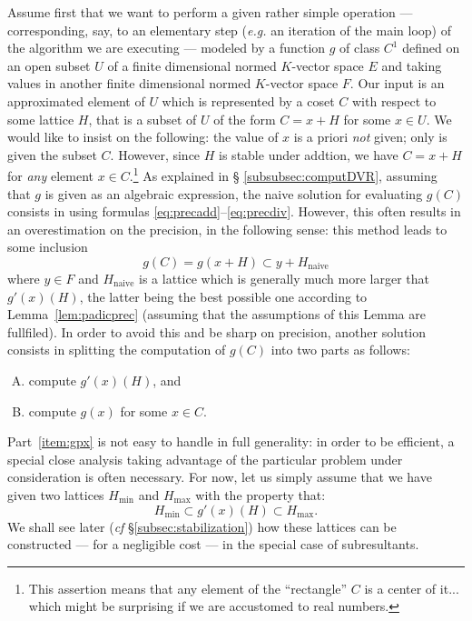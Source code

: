 \documentclass{article}
\begin{document}
Assume first that we want to perform a given rather simple operation --- 
corresponding, say, to an elementary step (\emph{e.g.} an iteration of 
the main loop) of the algorithm we are executing --- modeled by a 
function $g$ of class $C^1$ defined on an open subset $U$ of a finite 
dimensional normed $K$-vector space $E$ and taking values in another 
finite dimensional normed $K$-vector space $F$.
Our input is an approximated element of $U$ which is represented 
by a coset $C$ with respect to some lattice $H$, that is a subset of $U$ 
of the form $C = x+H$ for some $x \in U$. We would like to insist on the 
following: the value of $x$ is a priori \emph{not} given; only is given 
the subset $C$. However, since $H$ is stable under addtion, we have $C = 
x+H$ for \emph{any} element $x \in C$.\footnote{This assertion means that 
any element of the ``rectangle'' $C$ is a center of it... which might be 
surprising if we are accustomed to real numbers.} As explained in \S 
\ref{subsubsec:computDVR}, assuming that $g$ is given as an algebraic 
expression, the naive solution for evaluating $g(C)$ consists in using 
formulas \eqref{eq:precadd}--\eqref{eq:precdiv}. However, this often 
results in an overestimation on the precision, in the following sense: 
this method leads to some inclusion
$$g(C) = g(x+H) \subset y + H_{\text{naive}}$$
where $y \in F$ and $H_{\text{naive}}$ is a lattice which is generally 
much more larger that $g'(x)(H)$, the latter being the best possible
one according to
Lemma~\ref{lem:padicprec} (assuming that the assumptions of this Lemma
are fullfiled). In order to avoid this and be sharp on
precision, another solution consists in splitting the computation of 
$g(C)$ into two parts as follows:
\begin{enumerate}[(A)]
\item \label{item:gpx} compute $g'(x)(H)$, and
\item \label{item:gx} compute $g(x)$ for some $x \in C$.
\end{enumerate}
Part~\eqref{item:gpx} is not easy to handle in full generality: in order 
to be efficient, a special close analysis taking advantage of the 
particular problem under consideration is often necessary. For now, let 
us simply assume that we have given two lattices $H_\min$ and $H_\max$ 
with the property that:
\begin{equation}
\label{eq:Hminmax}
H_\min \subset g'(x)(H) \subset H_\max.
\end{equation}
We shall see later (\emph{cf} \S \ref{subsec:stabilization}) how these
lattices can be constructed --- for a negligible cost --- in the special 
case of subresultants. 
\end{document}

